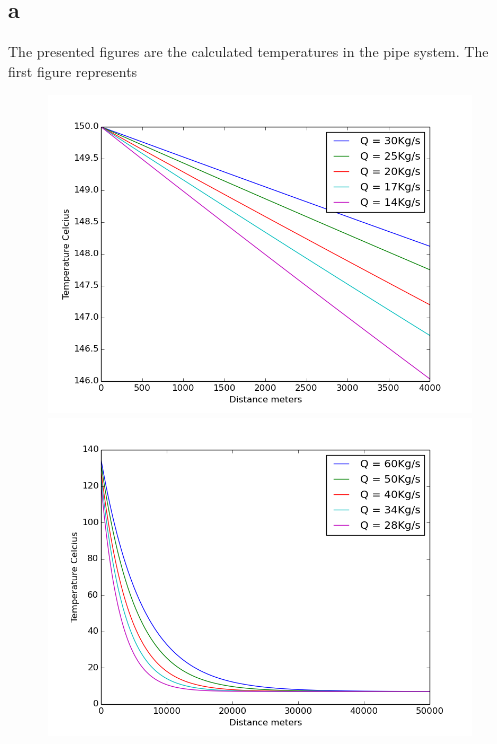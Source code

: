 \documentclass[a4paper,norsk]{article}
\begin{document}
\subsection*{a}
The presented figures are the calculated temperatures in the pipe system. The first figure represents 
\begin{figure}[h!]  
  \centering
  \includegraphics[scale=0.4]{wellhead.png}
  \includegraphics[scale=0.4]{shore.png}
\end{figure}
\newpage
\end{document}

